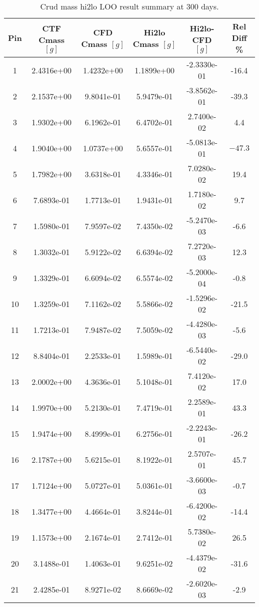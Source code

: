 \begin{table}[h]
    \begin{center}
        \caption[Hi2lo crud mass results]{Crud mass hi2lo LOO result summary at 300 days.}
    \begin{tabular}[h]{|c|c|c|c|c|c|}
        \hline
        Pin & CTF Cmass $[g]$& CFD Cmass $[g]$& Hi2lo Cmass $[g]$& Hi2lo-CFD $[g]$ & Rel Diff \% \\
\hline
1	 & 2.4316e+00 & 1.4232e+00 & 1.1899e+00 & -2.3330e-01 & -16.4\\
2	 & 2.1537e+00 & 9.8041e-01 & 5.9479e-01 & -3.8562e-01 & -39.3\\
3	 & 1.9302e+00 & 6.1962e-01 & 6.4702e-01 & 2.7400e-02 &  4.4\\
4	 & 1.9040e+00 & 1.0737e+00 & 5.6557e-01 & -5.0813e-01 &  $\mathbf{-47.3}$\\
5	 & 1.7982e+00 & 3.6318e-01 & 4.3346e-01 & 7.0280e-02 &  19.4\\
6	 & 7.6893e-01 & 1.7713e-01 & 1.9431e-01 & 1.7180e-02 &  9.7\\
7	 & 1.5980e-01 & 7.9597e-02 & 7.4350e-02 & -5.2470e-03 & -6.6\\
8	 & 1.3032e-01 & 5.9122e-02 & 6.6394e-02 & 7.2720e-03 &  12.3\\
9	 & 1.3329e-01 & 6.6094e-02 & 6.5574e-02 & -5.2000e-04 & -0.8\\
10	 &1.3259e-01 & 7.1162e-02 & 5.5866e-02 & -1.5296e-02  & -21.5\\
11	 &1.7213e-01 & 7.9487e-02 & 7.5059e-02 & -4.4280e-03  & -5.6\\
12	 &8.8404e-01 & 2.2533e-01 & 1.5989e-01 & -6.5440e-02  & -29.0\\
13	 &2.0002e+00 & 4.3636e-01 & 5.1048e-01 & 7.4120e-02 & 17.0\\
14	 &1.9970e+00 & 5.2130e-01 & 7.4719e-01 & 2.2589e-01 & 43.3\\
15	 &1.9474e+00 & 8.4999e-01 & 6.2756e-01 & -2.2243e-01  & -26.2\\
16	 &2.1787e+00 & 5.6215e-01 & 8.1922e-01 & 2.5707e-01 & 45.7\\
17	 &1.7124e+00 & 5.0727e-01 & 5.0361e-01 & -3.6600e-03  & -0.7\\
18	 &1.3477e+00 & 4.4664e-01 & 3.8244e-01 & -6.4200e-02  & -14.4\\
19	 &1.1573e+00 & 2.1674e-01 & 2.7412e-01 & 5.7380e-02 & 26.5\\
20	 &3.1488e-01 & 1.4063e-01 & 9.6251e-02 & -4.4379e-02  & -31.6\\
21	 &2.4285e-01 & 8.9271e-02 & 8.6669e-02 & -2.6020e-03  & -2.9\\

\end{tabular}
\end{center}
\end{table}
